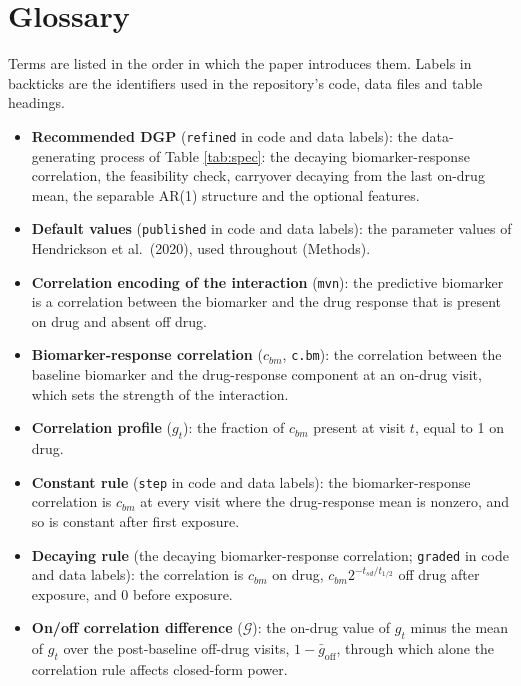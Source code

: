 \documentclass[
  11pt,
]{article}
\providecommand{\tightlist}{%
  \setlength{\itemsep}{0pt}\setlength{\parskip}{0pt}}
\begin{document}
\section*{Glossary}\label{glossary}

Terms are listed in the order in which the paper introduces them.
Labels in backticks are the identifiers used in the repository's
code, data files and table headings.

\begin{itemize}
\tightlist
\item
  \textbf{Recommended DGP} (\texttt{refined} in code and data labels): the
  data-generating process of Table \ref{tab:spec}: the decaying
  biomarker-response correlation, the feasibility check, carryover
  decaying from the last on-drug mean, the separable AR(1) structure
  and the optional features.
\item
  \textbf{Default values} (\texttt{published} in code and data labels): the
  parameter values of Hendrickson et al.~(2020), used throughout
  (Methods).
\item
  \textbf{Correlation encoding of the interaction} (\texttt{mvn}): the predictive
  biomarker is a correlation between the biomarker and the drug
  response that is present on drug and absent off drug.
\item
  \textbf{Biomarker-response correlation} (\(c_{bm}\), \texttt{c.bm}): the
  correlation between the baseline biomarker and the drug-response
  component at an on-drug visit, which sets the strength of the
  interaction.
\item
  \textbf{Correlation profile} (\(g_t\)): the fraction of \(c_{bm}\) present at
  visit \(t\), equal to 1 on drug.
\item
  \textbf{Constant rule} (\texttt{step} in code and data labels): the
  biomarker-response correlation is \(c_{bm}\) at every visit where the
  drug-response mean is nonzero, and so is constant after first
  exposure.
\item
  \textbf{Decaying rule} (the decaying biomarker-response correlation;
  \texttt{graded} in code and data labels): the correlation is \(c_{bm}\) on drug,
  \(c_{bm}2^{-t_{sd}/t_{1/2}}\) off drug after exposure, and 0 before
  exposure.
\item
  \textbf{On/off correlation difference} (\(\mathcal G\)): the on-drug value
  of \(g_t\) minus the mean of \(g_t\) over the post-baseline off-drug
  visits, \(1 - \bar g_{\text{off}}\), through which alone the
  correlation rule affects closed-form power.

\end{itemize}
\end{document}
